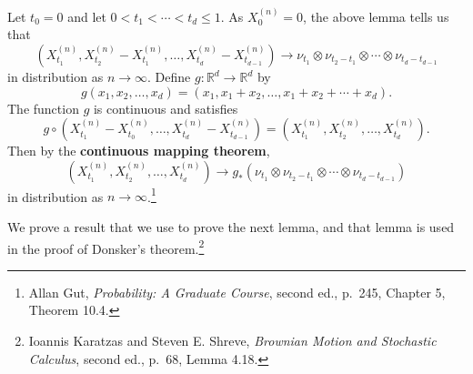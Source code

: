 \documentclass{article}
\theoremstyle{definition}
\theoremstyle{definition}
\begin{document}
Let $t_0=0$ and let $0<t_1<\cdots<t_d \leq 1$. As $X^{(n)}_0=0$,
the above lemma tells us that
\[
(X^{(n)}_{t_1},X^{(n)}_{t_2}-X^{(n)}_{t_1},\ldots,X^{(n)}_{t_d}-X^{(n)}_{t_{d-1}}) \to \nu_{t_1} \otimes \nu_{t_2-t_1} \otimes \cdots \otimes \nu_{t_d-t_{d-1}}
\]
in distribution as $n \to \infty$. 
Define $g:\mathbb{R}^d \to \mathbb{R}^d$ by
\[
g(x_1,x_2,\ldots,x_d) = (x_1,x_1+x_2,\ldots,x_1+x_2+\cdots+x_d).
\]
The function $g$  is continuous and satisfies
\[
g \circ (X^{(n)}_{t_1} - X^{(n)}_{t_{0}},
\ldots,X^{(n)}_{t_d} - X^{(n)}_{t_{d-1}})
=(X^{(n)}_{t_1},X^{(n)}_{t_2},\ldots,X^{(n)}_{t_d}).
\]
Then by the \textbf{continuous mapping theorem},
\begin{equation}
(X^{(n)}_{t_1},X^{(n)}_{t_2},\ldots,X^{(n)}_{t_d}) \to g_* (\nu_{t_1} \otimes \nu_{t_2-t_1} \otimes \cdots \otimes \nu_{t_d-t_{d-1}})
\label{continuousmapping}
\end{equation}
in distribution as $n \to \infty$.\footnote{Allan Gut, {\em Probability: A Graduate Course}, second ed., p.~245, Chapter 5, Theorem 10.4.}




We prove a result that we use to prove the next lemma, and that lemma is used in the proof of Donsker's theorem.\footnote{Ioannis Karatzas and Steven E. Shreve,
{\em Brownian Motion and Stochastic Calculus}, second ed., p.~68, Lemma 4.18.}
\end{document}
